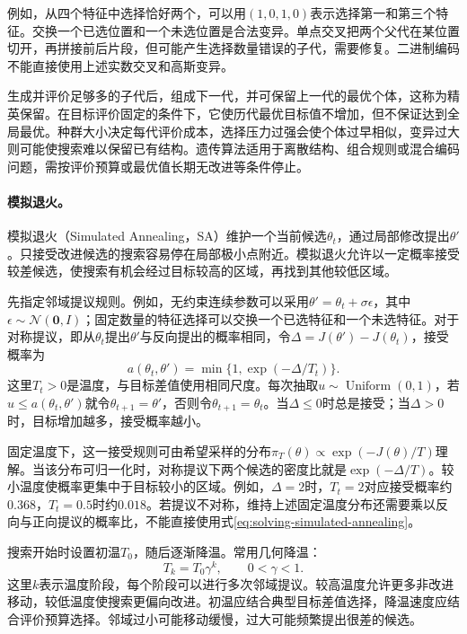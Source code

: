 例如，从四个特征中选择恰好两个，可以用$(1,0,1,0)$表示选择第一和第三个特征。交换一个已选位置和一个未选位置是合法变异。单点交叉把两个父代在某位置切开，再拼接前后片段，但可能产生选择数量错误的子代，需要修复。二进制编码不能直接使用上述实数交叉和高斯变异。

生成并评价足够多的子代后，组成下一代，并可保留上一代的最优个体，这称为精英保留。在目标评价固定的条件下，它使历代最优目标值不增加，但不保证达到全局最优。种群大小决定每代评价成本，选择压力过强会使个体过早相似，变异过大则可能使搜索难以保留已有结构。遗传算法适用于离散结构、组合规则或混合编码问题，需按评价预算或最优值长期无改进等条件停止。

\paragraph{模拟退火。}
模拟退火（Simulated Annealing，SA）维护一个当前候选$\theta_t$，通过局部修改提出$\theta'$。只接受改进候选的搜索容易停在局部极小点附近。模拟退火允许以一定概率接受较差候选，使搜索有机会经过目标较高的区域，再找到其他较低区域。

先指定邻域提议规则。例如，无约束连续参数可以采用$\theta'=\theta_t+\sigma\epsilon$，其中$\epsilon\sim\mathcal N(\bm0,I)$；固定数量的特征选择可以交换一个已选特征和一个未选特征。对于对称提议，即从$\theta_t$提出$\theta'$与反向提出的概率相同，令$\Delta=J(\theta')-J(\theta_t)$，接受概率为
\begin{equation}
 a(\theta_t,\theta')=\min\{1,\exp(-\Delta/T_t)\}.
 \label{eq:solving-simulated-annealing}
\end{equation}
这里$T_t>0$是温度，与目标差值使用相同尺度。每次抽取$u\sim\operatorname{Uniform}(0,1)$，若$u\leq a(\theta_t,\theta')$就令$\theta_{t+1}=\theta'$，否则令$\theta_{t+1}=\theta_t$。当$\Delta\leq0$时总是接受；当$\Delta>0$时，目标增加越多，接受概率越小。

固定温度下，这一接受规则可由希望采样的分布$\pi_T(\theta)\propto\exp(-J(\theta)/T)$理解。当该分布可归一化时，对称提议下两个候选的密度比就是$\exp(-\Delta/T)$。较小温度使概率更集中于目标较小的区域。例如，$\Delta=2$时，$T_t=2$对应接受概率约$0.368$，$T_t=0.5$时约$0.018$。若提议不对称，维持上述固定温度分布还需要乘以反向与正向提议的概率比，不能直接使用式\eqref{eq:solving-simulated-annealing}。

搜索开始时设置初温$T_0$，随后逐渐降温。常用几何降温：
\begin{equation}
 T_k=T_0\gamma^k,\qquad 0<\gamma<1.
\end{equation}
这里$k$表示温度阶段，每个阶段可以进行多次邻域提议。较高温度允许更多非改进移动，较低温度使搜索更偏向改进。初温应结合典型目标差值选择，降温速度应结合评价预算选择。邻域过小可能移动缓慢，过大可能频繁提出很差的候选。

